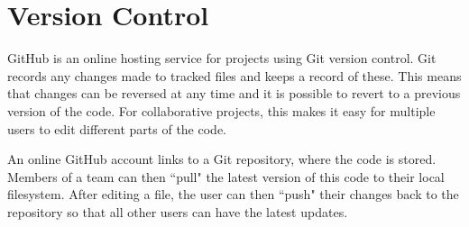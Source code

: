 
\section{Version Control}

GitHub is an online hosting service for projects using Git version control. Git records any changes made to tracked files and keeps a record of these. This means that changes can be reversed at any time and it is possible to revert to a previous version of the code. For collaborative projects, this makes it easy for multiple users to edit different parts of the code. 

An online GitHub account links to a Git repository, where the code is stored. Members of a team can then ``pull" the latest version of this code to their local filesystem. After editing a file, the user can then ``push" their changes back to the repository so that all other users can have the latest updates. 


